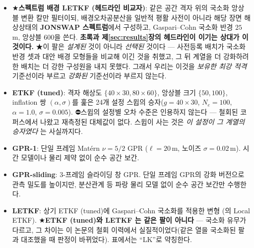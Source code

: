 \documentclass[11pt]{report}
\numberwithin{equation}{chapter}
\numberwithin{figure}{chapter}
\numberwithin{table}{chapter}
\begin{document}
\begin{itemize}
  \item ★\textbf{스펙트럼 배경 LETKF (헤드라인 비교자)}: 같은 공간 격자 위의
        국소화 앙상블 변환 칼만 필터이되, 배경오차공분산을 일반적 평활 사전이 아니라
        해당 장면 해상상태의 \textbf{JONSWAP 스펙트럼}에서 구성하고,
        Gaspari--Cohn 국소화 반경 $25$\,m, 앙상블 $600$을 쓴다.
        \textbf{초록과 제\ref{sec:results}장의 헤드라인이 이기는 상대가 이것이다.}
        ★이 팔은 \emph{설계된} 것이 아니라 \emph{선택된} 것이다 --- 사전등록 배치가
        국소화 반경 셋과 대안 배경 모형들을 비교해 이긴 것을 취했고, 그 뒤 계열을 더
        강화하려 한 배치는 더 강한 구성원을 내지 못했다. 그래서 우리는 이것을
        \emph{보유한 최강 적격} 기준선이라 부르고 \emph{강화된} 기준선이라 부르지 않는다.

  \item \textbf{ETKF (tuned)}: 격자 해상도 $\{40\times30, 80\times60\}$,
        앙상블 크기 $\{50, 100\}$, inflation 쌍 $(\alpha,\sigma)$를 훑은
        24개 설정 스윕의 승자($g=40\times30$, $N_e=100$, $\alpha=1.0$, $\sigma=0.005$).
        ⛔스윕의 설정별 오차 수준은 인용하지 않는다 --- 철회된 코퍼스에서 나왔고
        재측정된 대체값이 없다. 스윕이 사는 것은 \emph{이 설정이 그 계열의 승자였다}
        는 사실까지다.

  \item \textbf{GPR-1}: 단일 프레임 Mat\'{e}rn $\nu = 5/2$ GPR
        ($\ell = 20$\,m, 노이즈 $\sigma = 0.02$\,m).
        시간 모델이나 물리 제약 없이 순수 공간 보간.

  \item \textbf{GPR-sliding}: 3-프레임 슬라이딩 창 GPR.
        단일 프레임 GPR의 강화 버전으로 관측 밀도를 높이지만,
        분산관계 등 파랑 물리 모델 없이 순수 공간 보간만 수행한다.

  \item \textbf{LETKF}: 상기 ETKF (tuned)에 Gaspari--Cohn 국소화를 적용한 변형
        (\citet{Hunt2007}의 Local ETKF). ★\textbf{ETKF (tuned)와 LETKF 는 같은 팔이
        아니다} --- 국소화 유무가 다르고, 그 차이는 이 논문의 철회 이력에서
        실질적이었다(같은 열을 국소화된 팔과 대조했을 때 판정이 바뀌었다).
        표에서는 ``LK''로 약칭한다.
\end{itemize}
\end{document}
